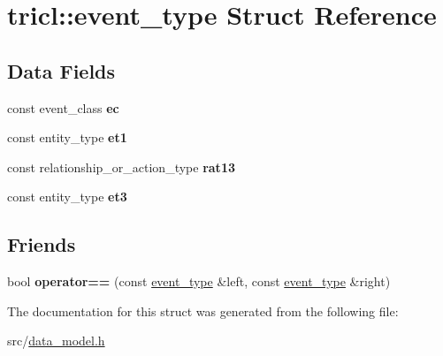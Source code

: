 \hypertarget{structtricl_1_1event__type}{}\section{tricl\+:\+:event\+\_\+type Struct Reference}
\label{structtricl_1_1event__type}
\subsection*{Data Fields}
\begin{DoxyCompactItemize}
\item 
\mbox{\label{structtricl_1_1event__type_a19e2bce4d3ba86cd149ac443e6189a21}} 
const event\+\_\+class {\bfseries ec}
\item 
\mbox{\label{structtricl_1_1event__type_ae1b97b7244cfc3edb110fc597695c184}} 
const entity\+\_\+type {\bfseries et1}
\item 
\mbox{\label{structtricl_1_1event__type_a12e8607ea565fb26c5392417bf4a34e9}} 
const relationship\+\_\+or\+\_\+action\+\_\+type {\bfseries rat13}
\item 
\mbox{\label{structtricl_1_1event__type_a6357a3b67f24559c66158260099f8847}} 
const entity\+\_\+type {\bfseries et3}
\end{DoxyCompactItemize}
\subsection*{Friends}
\begin{DoxyCompactItemize}
\item 
\mbox{\label{structtricl_1_1event__type_ac6ea5340a97cf343356e390f082881de}} 
bool {\bfseries operator==} (const \hyperlink{structtricl_1_1event__type}{event\+\_\+type} \&left, const \hyperlink{structtricl_1_1event__type}{event\+\_\+type} \&right)
\end{DoxyCompactItemize}


The documentation for this struct was generated from the following file\+:\begin{DoxyCompactItemize}
\item 
src/\hyperlink{data__model_8h}{data\+\_\+model.\+h}\end{DoxyCompactItemize}
